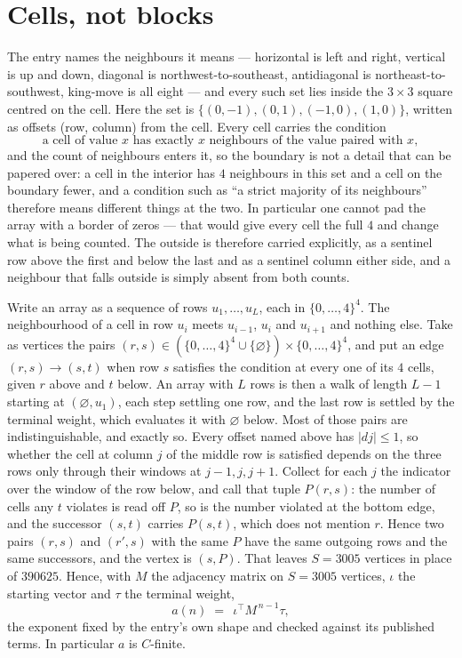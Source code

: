 \documentclass[11pt,a4paper]{article}
\theoremstyle{plain}
\theoremstyle{definition}
\begin{document}
\section{Cells, not blocks}

The entry names the neighbours it means --- horizontal is left and right, vertical is up and
down, diagonal is northwest-to-southeast, antidiagonal is northeast-to-southwest, king-move is
all eight --- and every such set lies inside the $3\times3$ square centred on the cell. Here
the set is $\{(0,-1), (0,1), (-1,0), (1,0)\}$, written as offsets (row, column) from the cell. Every cell carries
the condition
\[
\text{a cell of value }x\text{ has exactly }x\text{ neighbours of the value paired with }x,
\]
and the count of neighbours enters it, so the boundary is not a detail that can be papered
over: a cell in the interior has $4$ neighbours in this set and a cell on the boundary
fewer, and a condition such as ``a strict majority of its neighbours'' therefore means
different things at the two. In particular one cannot pad the array with a border of zeros ---
that would give every cell the full $4$ and change what is being counted. The outside is
therefore carried
explicitly, as a sentinel row above the first and below the last and as a sentinel column
either side, and a neighbour that falls outside is simply absent from both counts.

Write an array as a sequence of rows $u_1,\dots,u_L$, each in
$\{0,\dots,4\}^{4}$. The neighbourhood of a cell in row $u_i$ meets $u_{i-1}$,
$u_i$ and $u_{i+1}$ and nothing else. Take as vertices the pairs
$(r,s)\in(\{0,\dots,4\}^{4}\cup\{\varnothing\})\times\{0,\dots,4\}^{4}$,
and put an edge $(r,s)\to(s,t)$ when row $s$ satisfies the condition at every one of its
$4$ cells, given $r$ above and $t$ below. An array with $L$ rows is then a walk of length
$L-1$ starting at $(\varnothing,u_1)$, each step settling one row, and the last row is
settled by the terminal weight, which evaluates it with $\varnothing$ below. Most of those pairs are indistinguishable, and exactly so. Every offset named above has $|dj|\le 1$, so whether the cell at column $j$ of the middle row is satisfied depends on the three rows only through their windows at $j-1,j,j+1$. Collect for each $j$ the indicator over the window of the row below, and call that tuple $P(r,s)$: the number of cells any $t$ violates is read off $P$, so is the number violated at the bottom edge, and the successor $(s,t)$ carries $P(s,t)$, which does not mention $r$. Hence two pairs $(r,s)$ and $(r',s)$ with the same $P$ have the same outgoing rows and the same successors, and the vertex is $(s,P)$. That leaves $S=3005$ vertices in place of $390625$. Hence,
with $M$ the adjacency matrix on $S=3005$ vertices, $\iota$ the starting vector and $\tau$ the
terminal weight,
\[
a(n)\;=\;\,\iota^{\!\top}M^{\,n-1}\tau ,
\]
the exponent fixed by the entry's own shape and checked against its published terms. In
particular $a$ is $C$-finite.
\end{document}

